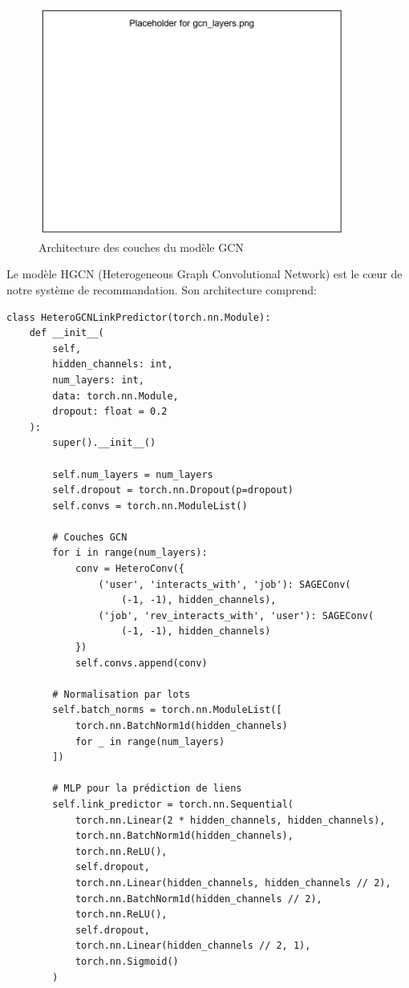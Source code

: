 \documentclass[12pt,a4paper]{article}
\begin{document}
\begin{figure}[H]
    \centering
    \includegraphics[width=0.9\textwidth]{images/gcn_layers.png}
    \caption{Architecture des couches du modèle GCN}
    \label{fig:gcn_layers}
\end{figure}

Le modèle HGCN (Heterogeneous Graph Convolutional Network) est le cœur de notre système de recommandation. Son architecture comprend:

\begin{lstlisting}[caption=Architecture complète du Modèle GCN]
class HeteroGCNLinkPredictor(torch.nn.Module):
    def __init__(
        self,
        hidden_channels: int,
        num_layers: int,
        data: torch.nn.Module,
        dropout: float = 0.2
    ):
        super().__init__()
        
        self.num_layers = num_layers
        self.dropout = torch.nn.Dropout(p=dropout)
        self.convs = torch.nn.ModuleList()
        
        # Couches GCN
        for i in range(num_layers):
            conv = HeteroConv({
                ('user', 'interacts_with', 'job'): SAGEConv(
                    (-1, -1), hidden_channels),
                ('job', 'rev_interacts_with', 'user'): SAGEConv(
                    (-1, -1), hidden_channels)
            })
            self.convs.append(conv)
        
        # Normalisation par lots
        self.batch_norms = torch.nn.ModuleList([
            torch.nn.BatchNorm1d(hidden_channels) 
            for _ in range(num_layers)
        ])
        
        # MLP pour la prédiction de liens
        self.link_predictor = torch.nn.Sequential(
            torch.nn.Linear(2 * hidden_channels, hidden_channels),
            torch.nn.BatchNorm1d(hidden_channels),
            torch.nn.ReLU(),
            self.dropout,
            torch.nn.Linear(hidden_channels, hidden_channels // 2),
            torch.nn.BatchNorm1d(hidden_channels // 2),
            torch.nn.ReLU(),
            self.dropout,
            torch.nn.Linear(hidden_channels // 2, 1),
            torch.nn.Sigmoid()
        )
\end{lstlisting}
\end{document}

